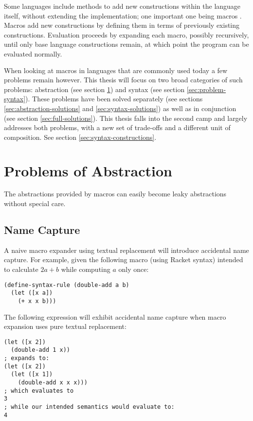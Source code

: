 \documentclass{kththesis}
\begin{document}
Some languages include methods to add new constructions within the language itself, without extending the implementation; one important one being macros \cite{Flatt2010Reference:-Rack,Hickey2008The-Clojure-pro,Matsakis2014The-rust-langua}. Macros add new constructions by defining them in terms of previously existing constructions. Evaluation proceeds by expanding each macro, possibly recursively, until only base language constructions remain, at which point the program can be evaluated normally.

When looking at macros in languages that are commonly used today a few problems remain however. This thesis will focus on two broad categories of such problems: abstraction (see section \ref{sec:problem-abstraction}) and syntax (see section \ref{sec:problem-syntax}). These problems have been solved separately (see sections \ref{sec:abstraction-solutions} and \ref{sec:syntax-solutions}) as well as in conjunction (see section \ref{sec:full-solutions}). This thesis falls into the second camp and largely addresses both problems, with a new set of trade-offs and a different unit of composition. See section \ref{sec:syntax-constructions}.

\section{Problems of Abstraction} \label{sec:problem-abstraction}

The abstractions provided by macros can easily become leaky abstractions without special care.

\subsection{Name Capture}

A naive macro expander using textual replacement will introduce accidental name capture. For example, given the following macro (using Racket \cite{Flatt2010Reference:-Rack} syntax) intended to calculate $2a + b$ while computing $a$ only once:

\begin{verbatim}
(define-syntax-rule (double-add a b)
  (let ([x a])
    (+ x x b)))
\end{verbatim}

The following expression will exhibit accidental name capture when macro expansion uses pure textual replacement:

\begin{verbatim}
(let ([x 2])
  (double-add 1 x))
; expands to:
(let ([x 2])
  (let ([x 1])
    (double-add x x x)))
; which evaluates to
3
; while our intended semantics would evaluate to:
4
\end{verbatim}
\end{document}
